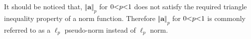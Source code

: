 \begin{remark}
It should be noticed that, $\Vert \boldsymbol{a} \Vert _p$ for $0 {<} p {<} 1$ does not satisfy the required triangle inequality property of a norm function.
Therefore $\Vert \boldsymbol{a} \Vert _p$ for $0 {<} p {<} 1$ is commonly referred to as a $\ell_p$ pseudo-norm instead of $\ell_p$ norm.
\end{remark}
